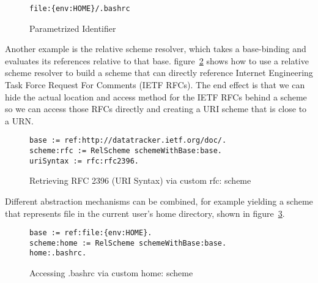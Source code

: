 \documentclass[preprint,authoryear]{acm_proc_article-sp}
\begin{document}
\begin{figure}[htbp]
\begin{center}
\begin{small}
\begin{verbatim}
file:{env:HOME}/.bashrc
\end{verbatim}
\end{small}
\caption{Parametrized Identifier}
\label{bashrc-pi}
\end{center}
\end{figure}

Another example is the relative scheme resolver, which takes a base-binding
and evaluates its references relative to that base.  figure~\ref{rfc-scheme} shows
how to use a relative scheme resolver to build a scheme that can directly
reference Internet Engineering Task Force Request For Comments (IETF RFCs).
The end effect is that we can hide the actual location and access method for
the IETF RFCs behind a scheme so we can access those RFCs directly and
creating a URI scheme that is close to a URN.

\begin{figure}[htbp]
\begin{center}
\begin{small}
\begin{verbatim}
base := ref:http://datatracker.ietf.org/doc/.
scheme:rfc := RelScheme schemeWithBase:base.
uriSyntax := rfc:rfc2396.
\end{verbatim}
\end{small}
\caption{Retrieving RFC 2396 (URI Syntax) via custom rfc: scheme}
\label{rfc-scheme}
\end{center}
\end{figure}

Different abstraction mechanisms can be combined, for example yielding
a scheme that represents file in the current user's home directory, shown
in figure~\ref{home-scheme}.


\begin{figure}[htbp]
\begin{center}
\begin{small}
\begin{verbatim}
base := ref:file:{env:HOME}.
scheme:home := RelScheme schemeWithBase:base.
home:.bashrc.
\end{verbatim}
\end{small}
\caption{Accessing .bashrc via custom home: scheme}
\label{home-scheme}
\end{center}
\end{figure}
\end{document}
